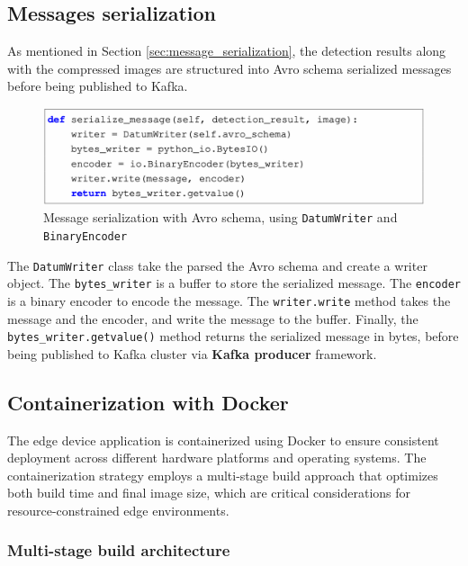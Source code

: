 \subsection{Messages serialization}
\label{sec:edge_message_serialization}

As mentioned in Section \ref{sec:message_serialization}, the detection results along with the compressed images are structured into Avro schema serialized messages before being published to Kafka.

\begin{figure}[htbp]
    \centering
    \includegraphics[width=1\textwidth]{Figure/avro_code.png}
    \caption{Message serialization with Avro schema, using \texttt{DatumWriter} and \texttt{BinaryEncoder}}
    \label{fig:avro_code}
\end{figure}

The \texttt{DatumWriter} class take the parsed the Avro schema and create a writer object. The \texttt{bytes\_writer} is a buffer to store the serialized message. The \texttt{encoder} is a binary encoder to encode the message. The \texttt{writer.write} method takes the message and the encoder, and write the message to the buffer. Finally, the \texttt{bytes\_writer.getvalue()} method returns the serialized message in bytes, before being published to Kafka cluster via \textbf{Kafka producer} framework.

\subsection{Containerization with Docker}
\label{sec:edge_containerization}

The edge device application is containerized using Docker to ensure consistent deployment across different hardware platforms and operating systems. The containerization strategy employs a multi-stage build approach that optimizes both build time and final image size, which are critical considerations for resource-constrained edge environments.

\subsubsection{Multi-stage build architecture}

